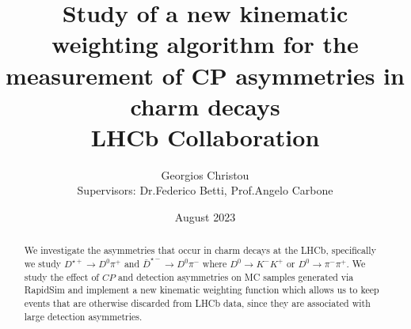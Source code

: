 \documentclass{article}
\title{\textbf{
        Study of a new kinematic weighting algorithm for the measurement of CP asymmetries in charm decays}
        \\
        LHCb Collaboration
}
\author{
        Georgios Christou
        \\
        Supervisors: Dr.\@ Federico Betti, Prof.\@ Angelo Carbone
}
\date{
        August 2023
}
\begin{document}
        \begin{figure}[t]
                \centering
                \hspace{1cm}
        \end{figure}

        \maketitle

        \begin{abstract}
                We investigate the asymmetries that occur in charm decays at the LHCb, specifically we study $D^{\star+}\to D^0\pi^+$ and $\bar{D}^{\star-}\to D^0\pi^-$ where $D^0\to K^-K^+$ or $D^0\to \pi^-\pi^+$.
                We study the effect of $CP$ and detection asymmetries on MC samples generated via RapidSim and implement a new kinematic weighting function which allows us to keep events that are otherwise discarded from LHCb data, since they are associated with large detection asymmetries.
        \end{abstract}
        
        \pagebreak
\end{document}
